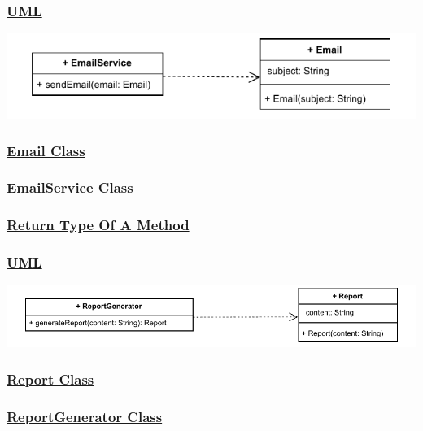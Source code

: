\subsubsection*{\underline{UML}}
\includegraphics[width=\textwidth]{Chapters/Diagram/OOP/EX3/ex3.b.drawio.pdf}

\subsubsection*{\underline{Email Class}}


\subsubsection*{\underline{EmailService Class}}



\subsubsection*{\underline{Return Type Of A Method}}
\subsubsection*{\underline{UML}}
\includegraphics[width=\textwidth]{Chapters/Diagram/OOP/EX3/ex3.c.drawio.pdf}

\subsubsection*{\underline{Report Class}}


\subsubsection*{\underline{ReportGenerator Class}}


